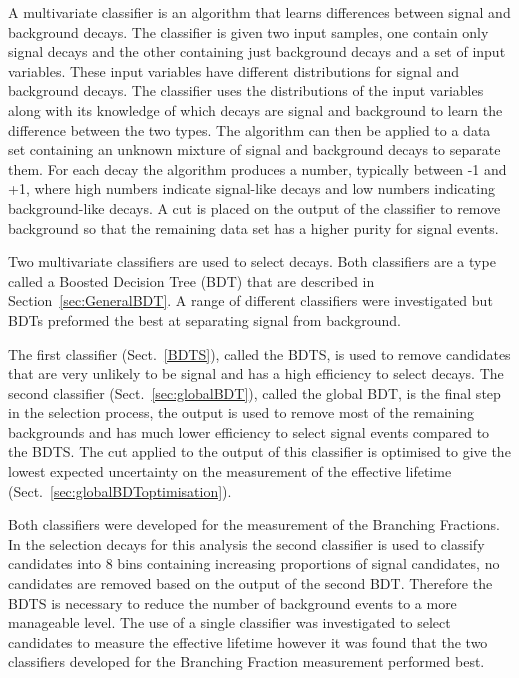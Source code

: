 A multivariate classifier is an algorithm that learns differences between signal and background decays. The classifier is given two input samples, one contain only signal decays and the other containing just background decays and a set of input variables. These input variables have different distributions for signal and background decays. The classifier uses the distributions of the input variables along with its knowledge of which decays are signal and background to learn the difference between the two types. The algorithm can then be applied to a data set containing an unknown mixture of signal and background decays to separate them. For each decay the algorithm produces a number, typically between -1 and +1, where high numbers indicate signal-like decays and low numbers indicating background-like decays. A cut is placed on the output of the classifier to remove background so that the remaining data set has a higher purity for signal events.

Two multivariate classifiers are used to select \bsmumu decays. Both classifiers are a type called a Boosted Decision Tree (BDT) that are described in Section~\ref{sec:GeneralBDT}. A range of different classifiers were investigated but BDTs preformed the best at separating signal from background. 

The first classifier (Sect.~\ref{BDTS}), called the BDTS, is used to remove candidates that are very unlikely to be signal and has a high efficiency to select \bsmumu decays. The second classifier (Sect.~\ref{sec:globalBDT}), called the global BDT, is the final step in the selection process, the output is used to remove most of the remaining backgrounds and has much lower efficiency to select signal events compared to the BDTS. The cut applied to the output of this classifier is optimised to give the lowest expected uncertainty on the measurement of the \bsmumu effective lifetime (Sect.~\ref{sec:globalBDToptimisation}).

Both classifiers were developed for the measurement of the \bmumu Branching Fractions. In the selection \bsmumu decays for this analysis the second classifier is used to classify candidates into 8 bins containing increasing proportions of signal candidates, no candidates are removed based on the output of the second BDT. Therefore the BDTS is necessary to reduce the number of background events to a more manageable level. The use of a single classifier was investigated to select candidates to measure the \bsmumu effective lifetime however it was found that the two classifiers developed for the Branching Fraction measurement performed best. 

